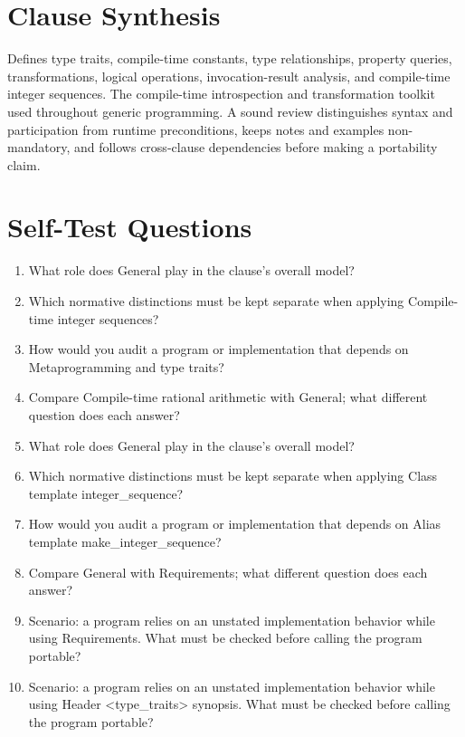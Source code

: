 \documentclass[11pt,letterpaper]{article}
\begin{document}
\section{Clause Synthesis}
\begin{CornellReferenceOrientationBox}Defines type traits, compile-time constants, type relationships, property queries, transformations, logical operations, invocation-result analysis, and compile-time integer sequences. The compile-time introspection and transformation toolkit used throughout generic programming. A sound review distinguishes syntax and participation from runtime preconditions, keeps notes and examples non-mandatory, and follows cross-clause dependencies before making a portability claim.\end{CornellReferenceOrientationBox}
\section{Self-Test Questions}
\begin{enumerate}
\item What role does General play in the clause's overall model?
\item Which normative distinctions must be kept separate when applying Compile-time integer sequences?
\item How would you audit a program or implementation that depends on Metaprogramming and type traits?
\item Compare Compile-time rational arithmetic with General; what different question does each answer?
\item What role does General play in the clause's overall model?
\item Which normative distinctions must be kept separate when applying Class template integer\_\allowbreak{}sequence?
\item How would you audit a program or implementation that depends on Alias template make\_\allowbreak{}integer\_\allowbreak{}sequence?
\item Compare General with Requirements; what different question does each answer?
\item Scenario: a program relies on an unstated implementation behavior while using Requirements. What must be checked before calling the program portable?
\item Scenario: a program relies on an unstated implementation behavior while using Header <type\_\allowbreak{}traits> synopsis. What must be checked before calling the program portable?
\end{enumerate}
\end{document}
